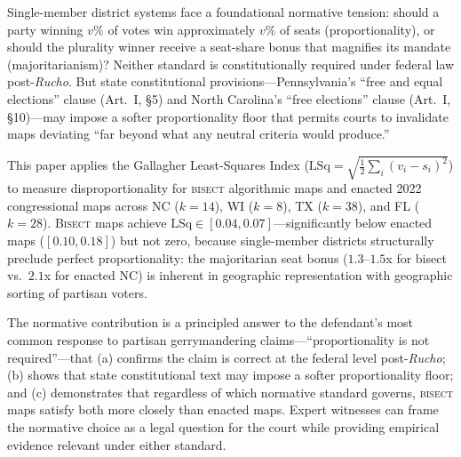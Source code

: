 Single-member district systems face a foundational normative tension: should a party winning
$v\%$ of votes win approximately $v\%$ of seats (proportionality), or should the plurality
winner receive a seat-share bonus that magnifies its mandate (majoritarianism)? Neither standard
is constitutionally required under federal law post-\textit{Rucho}. But state constitutional
provisions---Pennsylvania's ``free and equal elections'' clause (Art.\ I, \S 5) and North
Carolina's ``free elections'' clause (Art.\ I, \S 10)---may impose a softer proportionality
floor that permits courts to invalidate maps deviating ``far beyond what any neutral criteria
would produce.''

This paper applies the Gallagher Least-Squares Index ($\text{LSq} = \sqrt{\tfrac{1}{2}
\sum_i(v_i - s_i)^2}$) to measure disproportionality for \textsc{bisect} algorithmic maps
and enacted 2022 congressional maps across NC ($k=14$), WI ($k=8$), TX ($k=38$), and
FL ($k=28$). \textsc{Bisect} maps achieve $\text{LSq} \in [0.04, 0.07]$---significantly
below enacted maps ($[0.10, 0.18]$) but not zero, because single-member districts
structurally preclude perfect proportionality: the majoritarian seat bonus ($1.3$--$1.5$x
for bisect vs.\ $2.1$x for enacted NC) is inherent in geographic representation with
geographic sorting of partisan voters.

The normative contribution is a principled answer to the defendant's most common response
to partisan gerrymandering claims---``proportionality is not required''---that (a) confirms
the claim is correct at the federal level post-\textit{Rucho}; (b) shows that state
constitutional text may impose a softer proportionality floor; and (c) demonstrates that
regardless of which normative standard governs, \textsc{bisect} maps satisfy both more
closely than enacted maps. Expert witnesses can frame the normative choice as a legal
question for the court while providing empirical evidence relevant under either standard.
